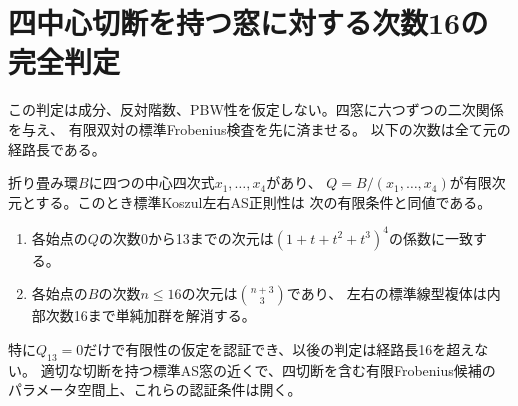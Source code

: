 \section{四中心切断を持つ窓に対する次数16の完全判定}
\label{sec:central-window-cutoff}
この判定は成分、反対階数、PBW性を仮定しない。四窓に六つずつの二次関係を与え、
有限双対の標準Frobenius検査を先に済ませる。
以下の次数は全て元の経路長である。
\begin{theorem}\label{thm:central-window-cutoff}
折り畳み環$B$に四つの中心四次式$x_1,\ldots,x_4$があり、
$Q=B/(x_1,\ldots,x_4)$が有限次元とする。このとき標準Koszul左右AS正則性は
次の有限条件と同値である。
\begin{enumerate}
\item 各始点の$Q$の次数$0$から13までの次元は$(1+t+t^2+t^3)^4$の係数に一致する。
\item 各始点の$B$の次数$n\le16$の次元は$\binom{n+3}{3}$であり、
左右の標準線型複体は内部次数16まで単純加群を解消する。
\end{enumerate}
特に$Q_{13}=0$だけで有限性の仮定を認証でき、以後の判定は経路長16を超えない。
適切な切断を持つ標準AS窓の近くで、四切断を含む有限Frobenius候補の
パラメータ空間上、これらの認証条件は開く。
\end{theorem}
